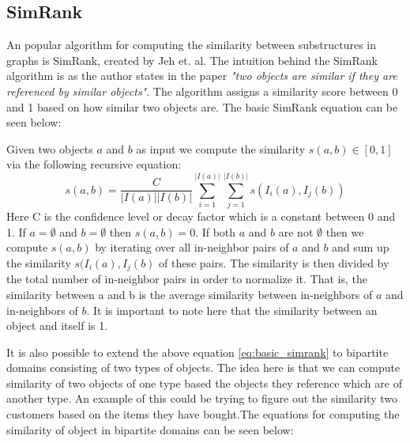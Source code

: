 \subsection{SimRank}
An popular algorithm for computing the similarity between substructures in graphs is SimRank, created by Jeh et. al\cite{10.1145/775047.775126}. The intuition behind the SimRank algorithm is as the author states in the paper \emph{"two objects are similar if they are referenced by similar objects"}\cite{10.1145/775047.775126}. The algorithm assigns a similarity score between 0 and 1 based on how similar two objects are. The basic SimRank equation can be seen below:
\begin{definition}[SimRank]\label{def:simrank} Given two objects $a$ and $b$ as input we compute the similarity $s(a,b) \in [0,1]$ via the following recursive equation:
	\begin{equation}\label{eq:basic_simrank}
	s(a,b)= \frac{C}{|I(a)||I(b)|}\sum^{|I(a)|}_{i=1}\sum^{|I(b)|}_{j=1}s(I_i(a),I_j(b))
	\end{equation}
	Here C is the confidence level or decay factor which is a constant between 0 and 1. If $a=\emptyset$ and $b= \emptyset$ then $s(a,b) = 0$. If both $a$ and $b$ are not $\emptyset$ then we compute $s(a,b)$ by iterating over all in-neighbor pairs of $a$ and $b$ and sum up the similarity $s(I_i(a),I_j(b)$ of these pairs. The similarity is then divided by the total number of in-neighbor pairs in order to normalize it. That is, the similarity between a and b is the average similarity between in-neighbors of $a$ and in-neighbors of $b$. It is important to note here that the similarity between an object and itself is 1\cite{10.1145/775047.775126}.
\end{definition}

It is also possible to extend the above equation \ref{eq:basic_simrank} to bipartite domains consisting of two types of objects. The idea here is that we can compute similarity of two objects of one type based the objects they reference which are of another type. An example of this could be trying to figure out the similarity two customers based on the items they have bought\cite{10.1145/775047.775126}.The equations for computing the similarity of object in bipartite domains can be seen below:

